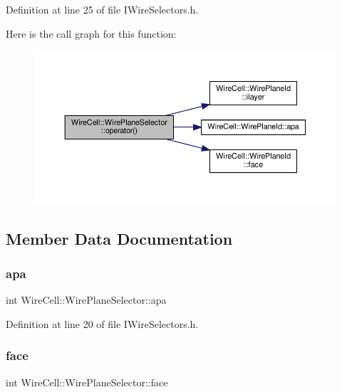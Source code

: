 Definition at line 25 of file I\+Wire\+Selectors.\+h.

Here is the call graph for this function\+:
\nopagebreak
\begin{figure}[H]
\begin{center}
\leavevmode
\includegraphics[width=350pt]{struct_wire_cell_1_1_wire_plane_selector_a4eed0b861e35e6e53872247eefa03fd8_cgraph}
\end{center}
\end{figure}


\subsection{Member Data Documentation}
\mbox{\label{struct_wire_cell_1_1_wire_plane_selector_a66fd505d67957b122581c452c825d791}} 
\subsubsection{\texorpdfstring{apa}{apa}}
{\footnotesize\ttfamily int Wire\+Cell\+::\+Wire\+Plane\+Selector\+::apa}



Definition at line 20 of file I\+Wire\+Selectors.\+h.

\mbox{\label{struct_wire_cell_1_1_wire_plane_selector_a9d4c4d9f12dded5d04aa20dd5f6c22d7}} 
\subsubsection{\texorpdfstring{face}{face}}
{\footnotesize\ttfamily int Wire\+Cell\+::\+Wire\+Plane\+Selector\+::face}



